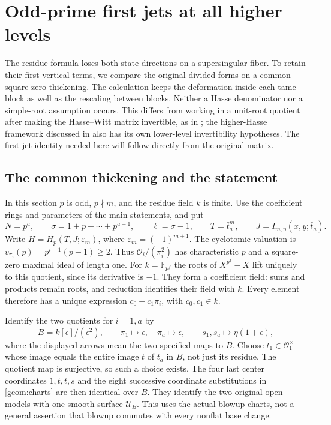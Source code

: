 \section{Odd-prime first jets at all higher levels}
\label{odd:section}

The residue formula loses both state directions on a supersingular fiber.
To retain their first vertical terms, we compare the original divided
forms on a common square-zero thickening. The calculation keeps the
deformation inside each tame block as well as the rescaling between
blocks. Neither a Hasse denominator nor a simple-root assumption occurs.
This differs from working in a unit-root quotient after making the
Hasse--Witt matrix invertible, as in \cite{BeukersVlasenko2021}; the
higher-Hasse framework discussed in \cite{Vlasenko2024} also has its own
lower-level invertibility hypotheses. The first-jet identity needed here
will follow directly from the original matrix.

\subsection{The common thickening and the statement}

In this section $p$ is odd, $p\nmid m$, and the residue field $k$ is
finite. Use the coefficient rings and parameters of the main statements,
and put
\[
 N=p^a,\qquad \sigma=1+p+\cdots+p^{a-1},\qquad
 \ell=\sigma-1,\qquad T=\bar t_a^m,
 \qquad J=I_{m,\eta}(x,y;\bar t_a).
\]
Write $H=H_p(T,J;\varepsilon_m)$, where
$\varepsilon_m=(-1)^{m+1}$. The cyclotomic valuation is
$v_{\pi_i}(p)=p^{i-1}(p-1)\ge2$. Thus
$\mathcal O_i/(\pi_i^2)$ has characteristic $p$ and a square-zero
maximal ideal of length one. For $k=\mathbb F_{p^f}$ the roots of
$X^{p^f}-X$ lift uniquely to this quotient, since its derivative is
$-1$. They form a coefficient field: sums and products remain roots,
and reduction identifies their field with $k$. Every element therefore
has a unique expression $c_0+c_1\pi_i$, with $c_0,c_1\in k$.

Identify the two quotients for $i=1,a$ by
\begin{equation}
 B=k[\epsilon]/(\epsilon^2),\qquad
 \pi_1\longmapsto\epsilon,\quad \pi_a\longmapsto\epsilon,
 \qquad s_1,s_a\longmapsto\eta(1+\epsilon),
 \label{odd:common-ring}
\end{equation}
where the displayed arrows mean the two specified maps to $B$.
Choose $t_1\in\mathcal O_1^\times$ whose image equals the entire image
$t$ of $t_a$ in $B$, not just its residue. The quotient map is
surjective, so such a choice exists. The four last center coordinates
$1,t,t,s$ and the eight successive coordinate substitutions in
\eqref{geom:charts} are then identical over $B$. They identify the two
original open models with one smooth surface $\mathcal U_B$.
This uses the actual blowup charts, not a general assertion that
blowup commutes with every nonflat base change.

